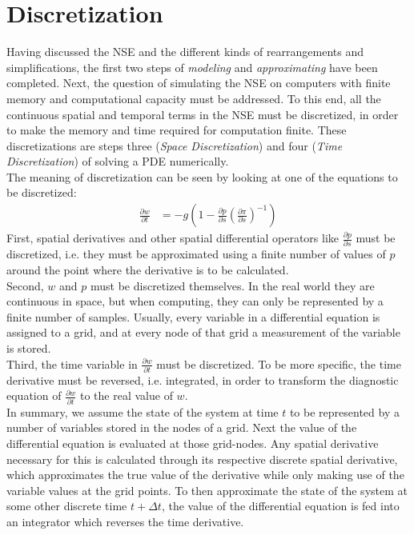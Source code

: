\chapter{Discretization}\label{chapter:discretization}
Having discussed the NSE and the different kinds of rearrangements and simplifications, the first two steps of \emph{modeling} and \emph{approximating} have been completed.
Next, the question of simulating the NSE on computers with finite memory and computational capacity must be addressed.
To this end, all the continuous spatial and temporal terms in the NSE must be discretized, in order to make the memory and time required for computation finite.
These discretizations are steps three (\emph{Space Discretization}) and four (\emph{Time Discretization}) of solving a PDE numerically.\\
The meaning of discretization can be seen by looking at one of the equations to be discretized:
\begin{align*}
\frac{\partial w}{\partial t} &= -g\left(1 - \frac{\partial p}{\partial s}\left(\frac{\partial \pi}{\partial s}\right)^{-1}\right)
\end{align*}
First, spatial derivatives and other spatial differential operators like $\frac{\partial p}{\partial s}$ must be discretized, i.e. they must be approximated using a finite number of values of $p$ around the point where the derivative is to be calculated.\\
Second, $w$ and $p$ must be discretized themselves.
In the real world they are continuous in space, but when computing, they can only be represented by a finite number of samples.
Usually, every variable in a differential equation is assigned to a grid, and at every node of that grid a measurement of the variable is stored.\\
Third, the time variable in $\frac{\partial w}{\partial t}$ must be discretized.
To be more specific, the time derivative must be reversed, i.e. integrated, in order to transform the diagnostic equation of $\frac{\partial w}{\partial t}$ to the real value of $w$.\\
In summary, we assume the state of the system at time $t$ to be represented by a number of variables stored in the nodes of a grid.
Next the value of the differential equation is evaluated at those grid-nodes.
Any spatial derivative necessary for this is calculated through its respective discrete spatial derivative, which approximates the true value of the derivative while only making use of the variable values at the grid points.
To then approximate the state of the system at some other discrete time $t+\Delta t$, the value of the differential equation is fed into an integrator which reverses the time derivative.

